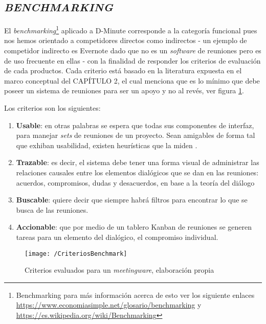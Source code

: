 \subsection{\textit{BENCHMARKING}}

El \textit{benchmarking}\footnote{Benchmarking para más información acerca de esto ver los siguiente enlaces \url{https://www.economiasimple.net/glosario/benchmarking} y \url{https://es.wikipedia.org/wiki/Benchmarking} } aplicado a D-Minute corresponde a la categoría funcional pues nos hemos orientado a competidores directos como indirectos - un ejemplo de competidor indirecto es Evernote dado que no es un \textit{software} de reuniones pero es de uso frecuente en ellas - con la finalidad de responder los criterios de evaluación de cada productos. Cada criterio está basado en la literatura expuesta en el marco conceptual del CAPÍTULO 2, el cual menciona que es lo mínimo que debe poseer un sistema de reuniones para ser un apoyo y no al revés, ver figura \ref{img3-2}.

Los criterios son los siguientes:

\begin{enumerate}[1.]
	\item \textbf{Usable}: en otras palabras se espera que todas sus componentes de interfaz, para manejar \textit{sets} de reuniones de un proyecto. Sean amigables de forma tal que exhiban usabilidad, existen heurísticas que la miden .
	\item \textbf{Trazable}: es decir, el sistema debe tener una forma visual de administrar las relaciones causales entre los elementos dialógicos que se dan en las reuniones: acuerdos, compromisos, dudas y desacuerdos, en base a la teoría del diálogo 
	\item \textbf{Buscable}: quiere decir que siempre habrá filtros para encontrar lo que se busca de las reuniones.
	\item \textbf{Accionable}: que por medio de un tablero Kanban de reuniones se generen tareas para un elemento del dialógico, el compromiso individual.
\end{enumerate}


\begin{figure}[h]
\centering
\texttt{[image: /CriteriosBenchmark]}
\caption{Criterios evaluados para un \textit{meetingware}, elaboración propia} 
\label{img3-2}
\end{figure}

